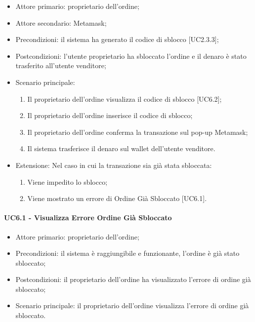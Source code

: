 \begin{itemize}
    \item Attore primario: proprietario dell'ordine;
    \item Attore secondario: Metamask\glo{};
    \item Precondizioni: il sistema ha generato il codice di sblocco [UC2.3.3];
    \item Postcondizioni: l'utente proprietario ha sbloccato l'ordine e il denaro è stato trasferito all'utente venditore;
    \item Scenario principale:
          \begin{enumerate}
              \item Il proprietario dell'ordine visualizza il codice di sblocco [UC6.2];
              \item Il proprietario dell'ordine inserisce il codice di sblocco;
              \item Il proprietario dell'ordine conferma la transazione sul pop-up Metamask\glo{};
              \item Il sistema trasferisce il denaro sul wallet\glo{} dell'utente venditore.
          \end{enumerate}
    \item Estensione: Nel caso in cui la transazione sia già stata sbloccata:
          \begin{enumerate}
              \item Viene impedito lo sblocco;
              \item Viene mostrato un errore di Ordine Già Sbloccato [UC6.1].
          \end{enumerate}
\end{itemize}

\paragraph{UC6.1 - Visualizza Errore Ordine Già Sbloccato}

\begin{itemize}
    \item Attore primario: proprietario dell'ordine;
    \item Precondizioni: il sistema è raggiungibile e funzionante, l'ordine è già stato sbloccato;
    \item Postcondizioni: il proprietario dell'ordine ha visualizzato l'errore di ordine già sbloccato;
    \item Scenario principale: il proprietario dell'ordine visualizza l'errore di ordine già sbloccato.
\end{itemize}

